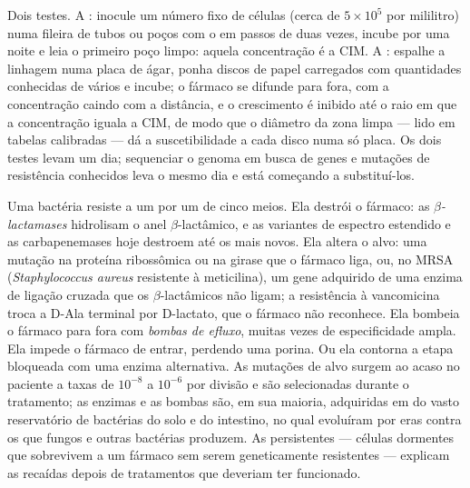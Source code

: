 \begin{method}\label{met:b3:bacteriology:mic}
Dois testes. A \emph{}: inocule um número fixo de
células (cerca de $5\times 10^{5}$ por mililitro) numa fileira de tubos
ou poços com o  em passos de duas vezes, incube por uma
noite e leia o primeiro poço limpo: aquela concentração é a CIM. A
\emph{}: espalhe a linhagem numa placa de ágar, ponha
discos de papel carregados com quantidades conhecidas de vários
 e incube; o fármaco se difunde para fora, com a
concentração caindo com a distância, e o crescimento é inibido até o
raio em que a concentração iguala a CIM, de modo que o diâmetro da zona
limpa --- lido em tabelas calibradas --- dá a suscetibilidade a cada
disco numa só placa. Os dois testes levam um dia; sequenciar o genoma
em busca de genes e mutações de resistência conhecidos leva o mesmo dia
e está começando a substituí-los.
\end{method}

\begin{definition}[Resistência]\label{def:b3:bacteriology:resistance}
Uma bactéria resiste a um  por um de cinco meios. Ela
destrói o fármaco: as \emph{$\beta$-lactamases} hidrolisam o anel
$\beta$-lactâmico, e as variantes de espectro estendido e as
carbapenemases hoje destroem até os mais novos. Ela altera o alvo: uma
mutação na proteína ribossômica ou na girase que o fármaco liga, ou,
no MRSA (\emph{Staphylococcus aureus} resistente à meticilina), um gene
adquirido de uma enzima de ligação cruzada que os $\beta$-lactâmicos
não ligam; a resistência à vancomicina troca a D-Ala terminal por
D-lactato, que o fármaco não reconhece. Ela bombeia o fármaco para fora
com \emph{bombas de efluxo}, muitas vezes de especificidade ampla. Ela
impede o fármaco de entrar, perdendo uma porina. Ou ela contorna a
etapa bloqueada com uma enzima alternativa. As mutações de alvo surgem
ao acaso no paciente a taxas de $10^{-8}$ a $10^{-6}$ por divisão e são
selecionadas durante o tratamento; as enzimas e as bombas são, em sua
maioria, adquiridas em  do vasto reservatório de bactérias do
solo e do intestino, no qual evoluíram por eras contra os 
que fungos e outras bactérias produzem. As persistentes --- células
dormentes que sobrevivem a um fármaco sem serem geneticamente
resistentes --- explicam as recaídas depois de tratamentos que
deveriam ter funcionado.
\end{definition}

